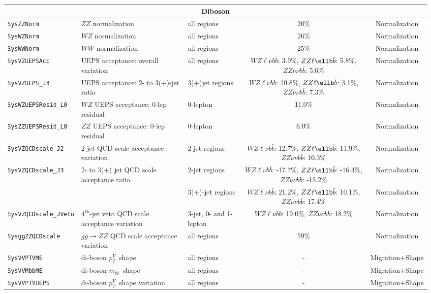 \begin{table}
{\begin{tabular}{l|llcc}
\hline
\hline
\multicolumn{5}{c}{Diboson}\\
\hline
\texttt{SysZZNorm}    & $ZZ$ normalization 	&  all regions  & 20\%	&Normalization\\
\texttt{SysWZNorm}    & $WZ$ normalization 	&  all regions	& 26\%	&Normalization\\
\texttt{SysWWNorm}    & $WW$ normalization 	&  all regions	& 25\%	&Normalization\\
\hline
\texttt{SysVZUEPSAcc} & UEPS acceptance: overall variation &  all regions & $WZ\ell\nu b\bar{b}$: 3.9\%, $ZZ\ell\ellb\bar{b}$: 5.8\%, $ZZ\nu\nu b\bar{b}$: 5.6\% & Normalization\\
\texttt{SysVZUEPS\_J3} & UEPS acceptance: $2$- to $3$(+)-jet ratio & 3(+)jet regions & $WZ\ell\nu b\bar{b}$: 10.8\%, $ZZ\ell\ellb\bar{b}$: 3.1\%, $ZZ\nu\nu b\bar{b}$: 7.3\% & Normalization\\
\texttt{SysWZUEPSResid\_L0} & $WZ$ UEPS acceptance: $0$-lep residual & $0$-lepton & 11.0\% & Normalization\\
\texttt{SysZZUEPSResid\_L0} & $ZZ$ UEPS acceptance: $0$-lep residual & $0$-lepton & 6.0\% & Normalization\\
\texttt{SysVZQCDscale\_J2} & $2$-jet QCD scale acceptance variation & 2-jet regions & $WZ\ell\nu b\bar{b}$: 12.7\%, $ZZ\ell\ellb\bar{b}$: 11.9\%, $ZZ\nu\nu b\bar{b}$: 10.3\% & Normalization\\
\texttt{SysVZQCDscale\_J3}
            & $2$- to $3$(+) jet QCD scale acceptance ratio & 2-jet regions   & $WZ\ell\nu b\bar{b}$: -17.7\%, $ZZ\ell\ellb\bar{b}$: -16.4\%, $ZZ\nu\nu b\bar{b}$: -15.2\% & Normalization\\
                                                         &  & 3(+)-jet regions & $WZ\ell\nu b\bar{b}$: 21.2\%, $ZZ\ell\ellb\bar{b}$: 10.1\%, $ZZ\nu\nu b\bar{b}$: 17.4\% & Normalization\\
\texttt{SysVZQCDscale\_JVeto} & $4^{\text{th}}$-jet veto QCD scale acceptance variation & 3-jet, 0- and 1-lepton & $WZ \ell \nu b \bar{b}$: 19.0\%, $ZZ\nu \nu b\bar{b}$: 18.2\% & Normalization\\
\texttt{SysggZZQCDscale} & $gg\to ZZ$ QCD scale acceptance variation & all regions & 59\% & Normalization\\
\hline
\texttt{SysVVPTVME} & di-boson $p_T^V$\ shape & all regions & - & Migration+Shape \\ 
\texttt{SysVVMbbME} & di-boson $m_{bb}$\ shape & all regions & - & Migration+Shape \\ 
\texttt{SysVVPTVUEPS} & di-boson $p_T^V$\ shape variation & all regions & - & Migration+Shape \\

\end{tabular}}
\end{table}

